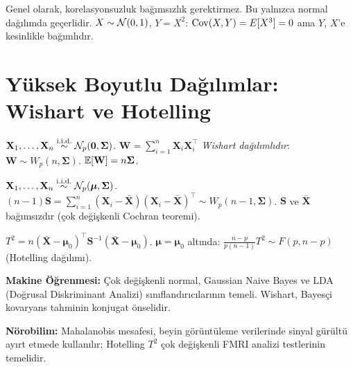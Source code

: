 \begin{hataanalizi}
Genel olarak, korelasyonsuzluk bağımsızlık gerektirmez. Bu yalnızca normal dağılımda geçerlidir. $X\sim\mathcal{N}(0,1)$, $Y=X^2$: $\operatorname{Cov}(X,Y)=E[X^3]=0$ ama $Y$, $X$'e kesinlikle bağımlıdır.
\end{hataanalizi}

\section{Yüksek Boyutlu Dağılımlar: Wishart ve Hotelling}
\label{sec:wishart_hotelling}

\begin{tanim}\label{def:wishart}
$\mathbf{X}_1,\ldots,\mathbf{X}_n\overset{\text{i.i.d.}}{\sim}\mathcal{N}_p(\mathbf{0},\boldsymbol\Sigma)$. $\mathbf{W}=\sum_{i=1}^n\mathbf{X}_i\mathbf{X}_i^\top$ \emph{Wishart dağılımlıdır}: $\mathbf{W}\sim W_p(n,\boldsymbol\Sigma)$.
$\mathbb{E}[\mathbf{W}]=n\boldsymbol\Sigma$.
\end{tanim}

\begin{ornek}\label{ex:onek_kovaryans}
$\mathbf{X}_1,\ldots,\mathbf{X}_n\overset{\text{i.i.d.}}{\sim}\mathcal{N}_p(\boldsymbol\mu,\boldsymbol\Sigma)$. $(n-1)\mathbf{S}=\sum_{i=1}^n(\mathbf{X}_i-\bar{\mathbf{X}})(\mathbf{X}_i-\bar{\mathbf{X}})^\top\sim W_p(n-1,\boldsymbol\Sigma)$.
$\mathbf{S}$ ve $\bar{\mathbf{X}}$ bağımsızdır (çok değişkenli Cochran teoremi).
\end{ornek}

\begin{tanim}\label{def:hotelling}
$T^2 = n(\bar{\mathbf{X}}-\boldsymbol\mu_0)^\top\mathbf{S}^{-1}(\bar{\mathbf{X}}-\boldsymbol\mu_0)$. $\boldsymbol\mu=\boldsymbol\mu_0$ altında: $\frac{n-p}{p(n-1)}T^2\sim F(p,n-p)$ (Hotelling dağılımı).
\end{tanim}

\begin{disiplinlerarasibaglan}
\textbf{Makine Öğrenmesi:} Çok değişkenli normal, Gaussian Naive Bayes ve LDA (Doğrusal Diskriminant Analizi) sınıflandırıcılarının temeli. Wishart, Bayesçi kovaryans tahminin konjugat önselidir.

\textbf{Nörobilim:} Mahalanobis mesafesi, beyin görüntüleme verilerinde sinyal gürültü ayırt etmede kullanılır; Hotelling $T^2$ çok değişkenli FMRI analizi testlerinin temelidir.
\end{disiplinlerarasibaglan}

